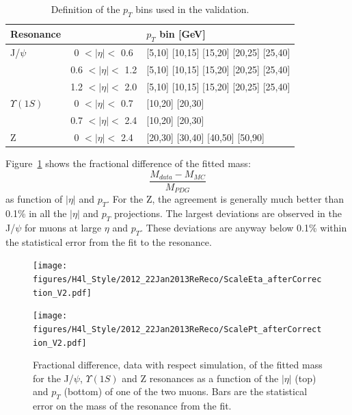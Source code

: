 \begin{table}[hbH]
\begin{center}
\caption{Definition of the $p_T$ bins used in the validation.\label{tab:pt_bins}}
\begin{tabular}{|l|cl|}
\hline
Resonance & & $p_T$ bin [GeV] \\
\hline
J/$\psi$      & 0   $<|\eta|<$ 0.6 & [5,10] [10,15] [15,20] [20,25] [25,40] \\
              & 0.6 $<|\eta|<$ 1.2 & [5,10] [10,15] [15,20] [20,25] [25,40] \\
              & 1.2 $<|\eta|<$ 2.0 & [5,10] [10,15] [15,20] [20,25] [25,40] \\
\hline                     
$\Upsilon(1S)$& 0   $<|\eta|<$ 0.7 & [10,20] [20,30] \\
              & 0.7 $<|\eta|<$ 2.4 & [10,20] [20,30] \\
\hline                     
Z             & 0   $<|\eta|<$ 2.4 & [20,30] [30,40] [40,50] [50,90] \\
\hline
\end{tabular}
\end{center}
\end{table}

Figure~\ref{fig:ScaleDATAMC_8TeV} shows the fractional difference of the fitted mass:
\[
\frac{M_{data}-M_{MC}}{M_{PDG}}
\]
as function of $|\eta|$ and  $p_T$. For the Z, the agreement is
generally much better than 0.1\% in all the $|\eta|$ and $p_T$ projections.
The largest deviations are observed in the J/$\psi$ for muons at large
$\eta$ and $p_T$. These deviations are anyway below 0.1\% within the
statistical error from the fit to the resonance.

\begin{figure}[hbtp]  
\begin{center}
\texttt{[image: figures/H4l\_Style/2012\_22Jan2013ReReco/ScaleEta\_afterCorrection\_V2.pdf]}
 \end{center}
\begin{center}
\texttt{[image: figures/H4l\_Style/2012\_22Jan2013ReReco/ScalePt\_afterCorrection\_V2.pdf]} 
 \end{center}
 \hspace{1cm} 
   \caption{Fractional difference, data with respect simulation, of the fitted mass for the J/$\psi$,
     $\Upsilon(1S)$ and Z resonances as a function of the $|\eta|$ (top)
     and $p_T$ (bottom) of one of the two muons. Bars are the
     statistical error on the mass of the resonance from the fit.
   \label{fig:ScaleDATAMC_8TeV}}
\end{figure} 

